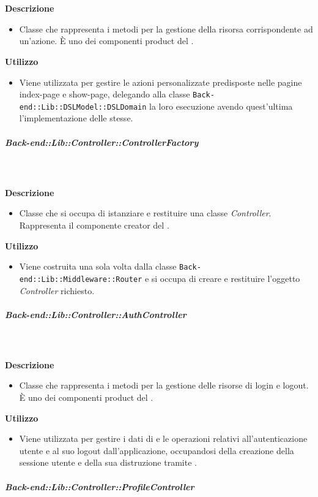         \textbf{\\ \\ Descrizione} 
          \begin{itemize}
            \item[] Classe che rappresenta i metodi per la gestione della risorsa corrispondente ad un'azione. 
È uno dei componenti product del  .
          \end{itemize}      
        \textbf{Utilizzo}  
          \begin{itemize}
            \item[] Viene utilizzata per gestire le azioni personalizzate predisposte nelle pagine index-page e show-page, delegando alla classe \texttt{Back-end::Lib::DSLModel::DSLDomain} la loro esecuzione avendo quest'ultima l'implementazione delle stesse. 
          \end{itemize}
      \subparagraph{Back-end::Lib::Controller::ControllerFactory}
        
        \textbf{\\ \\ Descrizione} 
          \begin{itemize}
            \item[] Classe che si occupa di istanziare e restituire una classe \textit{Controller}. Rappresenta il componente creator del  .
          \end{itemize}      
        \textbf{Utilizzo}  
          \begin{itemize}
            \item[] Viene costruita una sola volta dalla classe \texttt{Back-end::Lib::Middleware::Router} e si occupa di creare e restituire l'oggetto \textit{Controller} richiesto.
          \end{itemize}
      \subparagraph{Back-end::Lib::Controller::AuthController}
        
        \textbf{\\ \\ Descrizione} 
          \begin{itemize}
            \item[] Classe che rappresenta i metodi per la gestione delle risorse di login e logout. È uno dei componenti product del  .

          \end{itemize}      
        \textbf{Utilizzo}  
          \begin{itemize}
            \item[] Viene utilizzata per gestire i dati di e le operazioni relativi all'autenticazione utente e al suo logout dall'applicazione, occupandosi della creazione della sessione utente e della sua distruzione tramite .
          \end{itemize}
      \subparagraph{Back-end::Lib::Controller::ProfileController}
        
